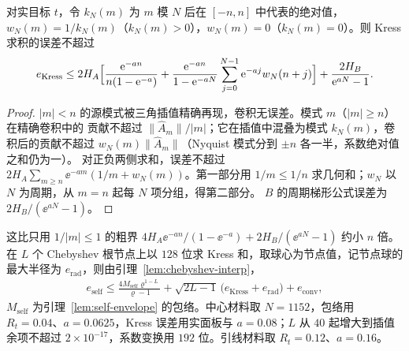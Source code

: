\begin{lemma}
  \label{lem:kress-real}
  对实目标 $t$，令 $k_N(m)$ 为 $m$ 模 $N$ 后在 $[-n,n]$ 中代表的绝对值，
  $w_N(m)=1/k_N(m)$（$k_N(m)>0$），$w_N(m)=0$（$k_N(m)=0$）。则 Kress 求积的误差不超过
  \begin{align}
    e_{\mathrm{Kress}}\leq2H_A\Bigl[\frac{\mathrm{e}^{-an}}{n(1-\mathrm{e}^{-a})}
    +\frac{\mathrm{e}^{-an}}{1-\mathrm{e}^{-aN}}\sum_{j=0}^{N-1}\mathrm{e}^{-aj}w_N(n+j)\Bigr]
    +\frac{2H_B}{\mathrm{e}^{aN}-1}.
    \label{eq:kress-error}
  \end{align}
\end{lemma}

\begin{proof}
  $|m|<n$ 的源模式被三角插值精确再现，卷积无误差。模式 $m$（$|m|\geq n$）在精确卷积中的
  贡献不超过 $\lVert\widehat A_m\rVert/|m|$；它在插值中混叠为模式 $k_N(m)$，卷积后的贡献不超过
  $w_N(m)\lVert\widehat A_m\rVert$（Nyquist 模式分到 $\pm n$ 各一半，系数绝对值之和仍为一）。
  对正负两侧求和，误差不超过 $2H_A\sum_{m\geq n}\ee^{-am}(1/m+w_N(m))$。第一部分用
  $1/m\leq1/n$ 求几何和；$w_N$ 以 $N$ 为周期，从 $m=n$ 起每 $N$ 项分组，得第二部分。
  $B$ 的周期梯形公式误差为 $2H_B/(\ee^{aN}-1)$\cite[定理~3.2]{TrefethenWeideman2014}。
\end{proof}

这比只用 $1/|m|\le1$ 的粗界 $4H_A\ee^{-an}/(1-\ee^{-a})+2H_B/(\ee^{aN}-1)$ 约小 $n$ 倍。
在 $L$ 个 Chebyshev 根节点上以 $128$ 位求 Kress 和，取球心为节点值，记节点球的最大半径为
$e_{\mathrm{rad}}$，则由引理~\ref{lem:chebyshev-interp}，
\begin{align}
  e_{\mathrm{self}}\leq\frac{4M_{\mathrm{self}}\varrho^{1-L}}{\varrho-1}
  +\sqrt{2L-1}\,\bigl(e_{\mathrm{Kress}}+e_{\mathrm{rad}}\bigr)+e_{\mathrm{conv}},
  \label{eq:self-error}
\end{align}
$M_{\mathrm{self}}$ 为引理~\ref{lem:self-envelope} 的包络。中心材料取 $N=1152$，包络用
$R_t=0.04$、$a=0.0625$，Kress 误差用实面板与 $a=0.08$；$L$ 从 $40$ 起增大到插值余项不超过
$2\times10^{-17}$，系数变换用 $192$ 位。引线材料取 $R_t=0.12$、$a=0.16$。

